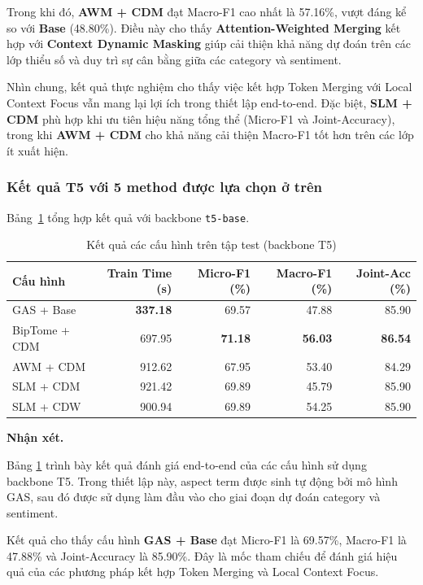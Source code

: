 Trong khi đó, \textbf{AWM + CDM} đạt Macro-F1 cao nhất là 57.16\%, vượt đáng kể so với \textbf{Base} (48.80\%). Điều này cho thấy \textbf{Attention-Weighted Merging} kết hợp với \textbf{Context Dynamic Masking} giúp cải thiện khả năng dự đoán trên các lớp thiểu số và duy trì sự cân bằng giữa các category và sentiment.

Nhìn chung, kết quả thực nghiệm cho thấy việc kết hợp Token Merging với Local Context Focus vẫn mang lại lợi ích trong thiết lập end-to-end. Đặc biệt, \textbf{SLM + CDM} phù hợp khi ưu tiên hiệu năng tổng thể (Micro-F1 và Joint-Accuracy), trong khi \textbf{AWM + CDM} cho khả năng cải thiện Macro-F1 tốt hơn trên các lớp ít xuất hiện.

\subsubsection*{Kết quả T5 với 5 method được lựa chọn ở trên}
Bảng~\ref{tab:t5_results} tổng hợp kết quả với backbone \texttt{t5-base}.

\begin{table}[H]
\centering
\small
\caption{Kết quả các cấu hình trên tập test (backbone T5)}
\label{tab:t5_results}
\begin{tabular}{@{}lrrrr@{}}
\toprule
\textbf{Cấu hình} & \textbf{Train Time (s)} & \textbf{Micro-F1 (\%)} & \textbf{Macro-F1 (\%)} & \textbf{Joint-Acc (\%)} \\
\midrule
GAS + Base           & \textbf{337.18} & 69.57 & 47.88 & 85.90 \\
BipTome + CDM       & 697.95 & \textbf{71.18} & \textbf{56.03} & \textbf{86.54} \\
AWM + CDM     & 912.62 & 67.95 & 53.40 & 84.29 \\
SLM + CDM       & 921.42 & 69.89 & 45.79 & 85.90 \\
SLM + CDW       & 900.94 & 69.89 & 54.25 & 85.90 \\
\bottomrule
\end{tabular}
\end{table}

\textbf{Nhận xét.}

Bảng \ref{tab:t5_results} trình bày kết quả đánh giá end-to-end của các cấu hình sử dụng backbone T5. Trong thiết lập này, aspect term được sinh tự động bởi mô hình GAS, sau đó được sử dụng làm đầu vào cho giai đoạn dự đoán category và sentiment.

Kết quả cho thấy cấu hình \textbf{GAS + Base} đạt Micro-F1 là 69.57\%, Macro-F1 là 47.88\% và Joint-Accuracy là 85.90\%. Đây là mốc tham chiếu để đánh giá hiệu quả của các phương pháp kết hợp Token Merging và Local Context Focus.

